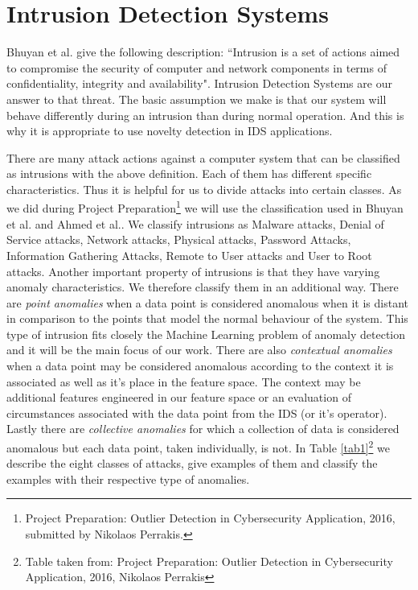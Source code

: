 \documentclass[reqno,openany,12pt]{amsbook}
\begin{document}
\section{Intrusion Detection Systems}

Bhuyan et al.\cite{ids1} give the following description: ``Intrusion is a set of actions aimed to compromise the security of computer and network components in terms of confidentiality, integrity and availability". Intrusion Detection Systems are our answer to that threat. The basic assumption we make is that our system will behave differently during an intrusion than during normal operation. And this is why it is appropriate to use novelty detection in IDS applications.

There are many attack actions against a computer system that can be classified as intrusions with the above definition. Each of them has different specific characteristics. Thus it is helpful for us to divide attacks into certain classes. As we did during Project Preparation\footnote{Project Preparation: Outlier Detection in Cybersecurity Application, 2016, submitted by Nikolaos Perrakis.} we will use the classification used in Bhuyan et al.\cite{ids1} and Ahmed et al.\cite{ids2}. We classify intrusions as Malware attacks, Denial of Service attacks, Network attacks, Physical attacks, Password Attacks, Information Gathering Attacks, Remote to User attacks and User to Root attacks.
Another important property of intrusions is that they have varying anomaly characteristics. We therefore classify them in an additional way. There are \emph{point anomalies} when a data point is considered anomalous when it is distant in comparison to the points that model the normal behaviour of the system. This type of intrusion fits closely the Machine Learning problem of anomaly detection and it will be the main focus of our work. There are also \emph{contextual anomalies} when a data point may be considered anomalous according to the context it is associated as well as it's place in the feature space. The context may be additional features engineered in our feature space or an evaluation of circumstances associated with the data point from the IDS (or it's operator). Lastly there are \emph{collective anomalies} for which a collection of data is considered anomalous but each data point, taken individually, is not. In Table \ref{tab1}\footnote{Table taken from: Project Preparation: Outlier Detection in Cybersecurity Application, 2016, Nikolaos Perrakis} we describe the eight classes of attacks, give examples of them and classify the examples with their respective type of anomalies.
\end{document}
